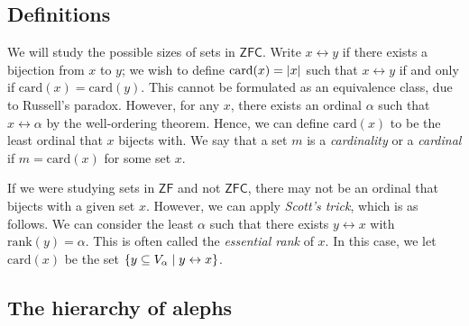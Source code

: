 \subsection{Definitions}
We will study the possible sizes of sets in \( \mathsf{ZFC} \).
Write \( x \leftrightarrow y \) if there exists a bijection from \( x \) to \( y \); we wish to define \( \mathrm{card}(x) = \abs{x} \) such that \( x \leftrightarrow y \) if and only if \( \mathrm{card}(x) = \mathrm{card}(y) \).
This cannot be formulated as an equivalence class, due to Russell's paradox.
However, for any \( x \), there exists an ordinal \( \alpha \) such that \( x \leftrightarrow \alpha \) by the well-ordering theorem.
Hence, we can define \( \mathrm{card}(x) \) to be the least ordinal that \( x \) bijects with.
We say that a set \( m \) is a \emph{cardinality} or a \emph{cardinal} if \( m = \mathrm{card}(x) \) for some set \( x \).

If we were studying sets in \( \mathsf{ZF} \) and not \( \mathsf{ZFC} \), there may not be an ordinal that bijects with a given set \( x \).
However, we can apply \emph{Scott's trick}, which is as follows.
We can consider the least \( \alpha \) such that there exists \( y \leftrightarrow x \) with \( \mathrm{rank}(y) = \alpha \).
This is often called the \emph{essential rank} of \( x \).
In this case, we let \( \mathrm{card}(x) \) be the set \( \qty{y \subseteq V_\alpha \mid y \leftrightarrow x} \).

\subsection{The hierarchy of alephs}
